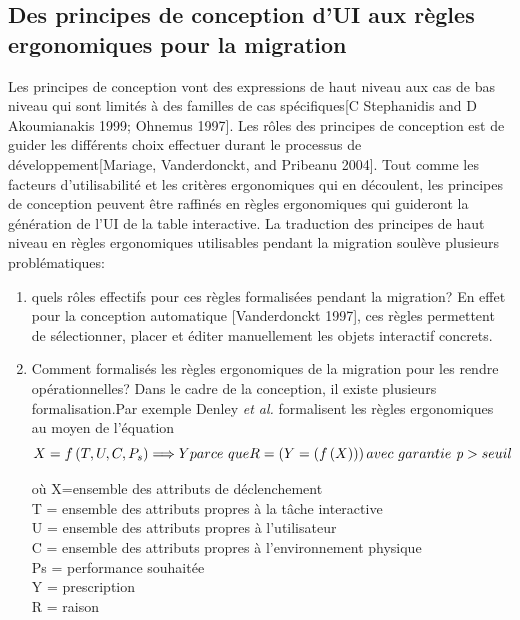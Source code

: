 \subsection{Des principes de conception d'UI aux règles ergonomiques pour la migration}
Les principes de conception vont des expressions de haut niveau aux cas de bas niveau qui sont limités à des familles de cas spécifiques[C Stephanidis and D Akoumianakis 1999; Ohnemus 1997]. Les rôles des principes de conception est de guider les différents choix effectuer durant le processus de développement[Mariage, Vanderdonckt, and Pribeanu 2004]. Tout comme les facteurs d'utilisabilité et les critères ergonomiques qui en découlent, les principes de conception peuvent être raffinés en règles ergonomiques qui guideront la génération de l'UI de la table interactive.  
La traduction des principes de haut niveau en règles ergonomiques utilisables pendant la migration soulève plusieurs problématiques: 
\begin{enumerate}
\item quels rôles effectifs pour ces règles formalisées pendant la migration? En effet pour la conception automatique [Vanderdonckt 1997], ces règles permettent de sélectionner, placer et éditer manuellement les objets interactif concrets.
\item Comment formalisés les règles ergonomiques de la migration pour les rendre opérationnelles? Dans le cadre de la conception, il existe plusieurs formalisation.Par exemple Denley \textit{et al.} formalisent les règles ergonomiques au moyen de l'équation 
\begin{equation}
X=f\left( T,U,C,P_s\right) \Longrightarrow Y parce\ que R=\left( Y=\left( f\left( X\right) \right) \right)\\
avec\ garantie\ \textit{p} >seuil 
\end{equation}

où X=ensemble des attributs de déclenchement\\
T = ensemble des attributs propres à la tâche interactive\\
U = ensemble des attributs propres à l'utilisateur\\
C = ensemble des attributs propres à l'environnement physique\\
Ps = performance souhaitée\\
Y = prescription\\
R = raison\\
\end{enumerate}


